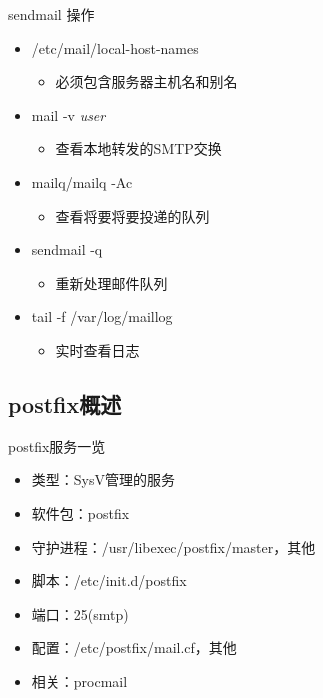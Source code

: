 \begin{frame}{sendmail 操作}
\begin{itemize}
\item /etc/mail/local-host-names

\begin{itemize}
\item 必须包含服务器主机名和别名
\end{itemize}
\item mail -v \emph{user}

\begin{itemize}
\item 查看本地转发的SMTP交换
\end{itemize}
\item mailq/mailq -Ac

\begin{itemize}
\item 查看将要将要投递的队列
\end{itemize}
\item sendmail -q

\begin{itemize}
\item 重新处理邮件队列
\end{itemize}
\item tail -f /var/log/maillog

\begin{itemize}
\item 实时查看日志
\end{itemize}
\end{itemize}


\subsection{postfix概述}


\end{frame} 
\begin{frame}{postfix服务一览}
\begin{itemize}
\item 类型：SysV管理的服务
\item 软件包：postfix
\item 守护进程：/usr/libexec/postfix/master，其他
\item 脚本：/etc/init.d/postfix
\item 端口：25(smtp)
\item 配置：/etc/postfix/mail.cf，其他
\item 相关：procmail
\end{itemize}

\end{frame} 
